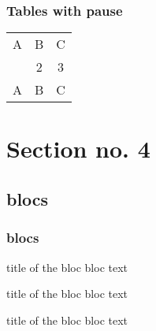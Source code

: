 \documentclass[hyperref={pdfpagelabels=false}]{beamer}
\begin{document}
\begin{frame}
  \frametitle{Tables with pause}
  \begin{tabular}{c c c}
    A & B & C \\
    \pause
    1 & 2 & 3 \\
    \pause
    A & B & C \\
  \end{tabular}
\end{frame}


\section{Section no. 4}
\subsection{blocs}
\begin{frame}
  \frametitle{blocs}

  \begin{block}{title of the bloc}
    bloc text
  \end{block}

  \begin{exampleblock}{title of the bloc}
    bloc text
  \end{exampleblock}


  \begin{alertblock}{title of the bloc}
    bloc text
  \end{alertblock}
\end{frame}
\end{document}
